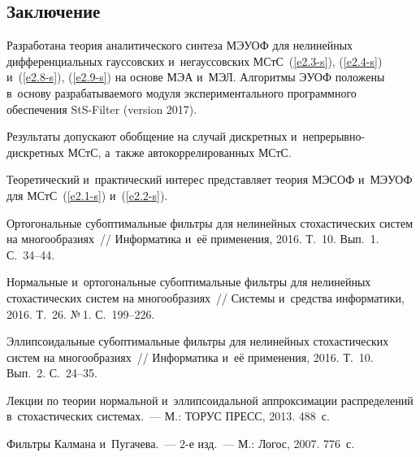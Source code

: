 \begin{multicols}{2}
\vspace*{-12pt}

\section{Заключение}

\vspace*{-2pt}

Разработана теория аналитического синтеза 
МЭУОФ для нелинейных дифференциальных гауссовских и~негауссовских МСтС~(\ref{e2.3-s}), 
(\ref{e2.4-s}) и~(\ref{e2.8-s}), (\ref{e2.9-s}) 
на основе МЭА и~МЭЛ.  Алгоритмы ЭУОФ положены в~основу разрабатываемого модуля 
экспериментального программного обеспечения  StS-Filter (version 2017).

Результаты допускают обобщение на случай дискретных  и~не\-пре\-рыв\-но-дис\-крет\-ных МСтС, 
а~также автокоррелированных МСтС.

Теоретический и~практический интерес представляет теория  МЭСОФ и~МЭУОФ для МСтС~(\ref{e2.1-s}) 
и~(\ref{e2.2-s}).

\vspace*{-12pt}

{\small\frenchspacing
 {%
 \begin{thebibliography}{99}
 
 \vspace*{-2pt}
 
Ортогональные субоптимальные фильтры для нелинейных стохастических систем 
на многообразиях~// Информатика и~её применения, 2016. Т.~10. Вып.~1. С.~34--44.

Нормальные и~ортогональные субоптимальные фильтры для нелинейных стохастических 
сис\-тем на многообразиях~// Системы и~средства информатики, 2016. Т.~26. №\,1. С.~199--226.

Эллипсоидальные субоптимальные фильтры для нелинейных 
стохастических систем на многообразиях~// Информатика и~её применения, 2016. Т.~10. Вып.~2. С.~24--35.

Лекции по теории нормальной и~эллипсоидальной аппроксимации распределений 
в~стохастических системах.~--- М.: ТОРУС ПРЕСС, 2013. 488~с.



Фильтры Калмана и~Пугачева.~--- 2-е изд.~--- М.: Логос, 2007. 776~с.


\end{thebibliography}}}
\end{multicols}
